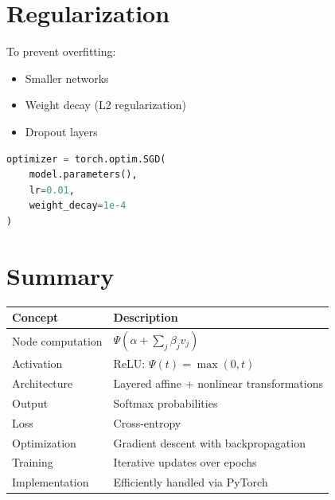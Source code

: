 \documentclass[12pt,oneside]{book}
\numberwithin{equation}{section}
\theoremstyle{definition}
\theoremstyle{plain}
\theoremstyle{remark}
\begin{document}
\section{Regularization}

To prevent overfitting:

\begin{itemize}
\item Smaller networks
\item Weight decay (L2 regularization)
\item Dropout layers
\end{itemize}

\begin{lstlisting}[language=Python]
optimizer = torch.optim.SGD(
    model.parameters(), 
    lr=0.01, 
    weight_decay=1e-4
)
\end{lstlisting}

\section{Summary}

\begin{center}
\begin{xltabular}{\textwidth}{>{\raggedright\arraybackslash}p{0.28\textwidth}
>{\raggedright\arraybackslash}X}
\toprule
Concept & Description \\
\midrule
Node computation & $\Psi(\alpha + \sum_j \beta_j v_j)$ \\

Activation & ReLU: $\Psi(t)=\max(0,t)$ \\

Architecture & Layered affine + nonlinear transformations \\

Output & Softmax probabilities \\

Loss & Cross-entropy \\

Optimization & Gradient descent with backpropagation \\

Training & Iterative updates over epochs \\

Implementation & Efficiently handled via PyTorch \\

\bottomrule
\end{xltabular}
\end{center}
\end{document}

